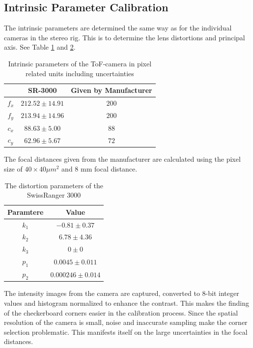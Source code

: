 \subsection{Intrinsic Parameter Calibration}
The intrinsic parameters are determined the same way as for the individual cameras in the
stereo rig. This is to determine the lens distortions and principal axis. See Table
\ref{chap3:tab-intrinsic-sr3000} and \ref{chap3:tab-dist-sr3000}.
\begin{table}[htbp]
  \centering
    \begin{tabular}{|c|c|c|} 
        \hline
                & SR-3000       & Given by Manufacturer \\
        \hline
        $f_x$   & $212.52 \pm 14.91 $  & $200$  \\
        $f_y$   & $213.94 \pm 14.96 $  & $200$  \\
        \hline
        $c_x$   & $88.63 \pm 5.00$  & $88$ \\
        $c_y$   & $ 62.96 \pm 5.67 $ & $72$  \\
        \hline
    \end{tabular}
    \caption{Intrinsic parameters of the ToF-camera in pixel related units including
    uncertainties}
    \label{chap3:tab-intrinsic-sr3000}
\end{table}
The focal distances given from the manufacturer are calculated using the pixel size of
$40 \times 40 \mu m^2$ and 8 mm focal distance.
\begin{table}[htbp]
    \centering
    \begin{tabular}{|c|c|}
        \hline
        Paramtere & Value \\
        \hline
        $k_1$   & $-0.81 \pm 0.37$  \\ 
        $k_2$   & $6.78 \pm 4.36$   \\
        $k_3$   & $0 \pm 0$  \\
        \hline
        $p_1$   & $0.0045 \pm 0.011$ \\
        $p_2$   & $0.000246 \pm 0.014$ \\
        \hline
    \end{tabular}
    \caption{The distortion parameters of the SwissRanger 3000}
    \label{chap3:tab-dist-sr3000}
\end{table}

The intensity images from
the camera are captured, converted to 8-bit integer values and histogram normalized to
enhance the contrast. This makes the finding of the checkerboard corners easier in
the calibration process. Since the spatial resolution of the camera is small, noise and
inaccurate sampling make the corner selection problematic. This manifests itself on the large
uncertainties in the focal distances. 

